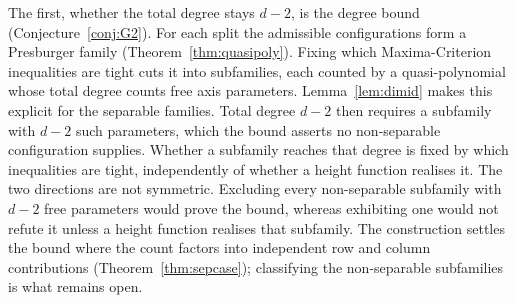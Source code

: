 \documentclass[11pt]{article}
\theoremstyle{definition}
\theoremstyle{remark}
\begin{document}
The first, whether the total degree stays $d-2$, is the degree bound
(Conjecture~\ref{conj:G2}). For each split the admissible configurations form a
Presburger family (Theorem~\ref{thm:quasipoly}). Fixing which
Maxima-Criterion inequalities are tight cuts it into subfamilies, each counted
by a quasi-polynomial whose total degree counts free axis parameters.
Lemma~\ref{lem:dimid} makes this explicit for the separable families. Total degree
$d-2$ then requires a subfamily with $d-2$ such parameters, which the bound
asserts no non-separable configuration supplies. Whether a subfamily reaches
that degree is fixed by which inequalities are tight, independently of whether a
height function realises it. The two directions are not symmetric. Excluding
every non-separable subfamily with $d-2$ free parameters would prove the bound,
whereas exhibiting one would not refute it unless a height function realises that subfamily.
The construction settles the bound where the count factors into independent row
and column contributions (Theorem~\ref{thm:sepcase}); classifying the
non-separable subfamilies is what remains open.
\end{document}
